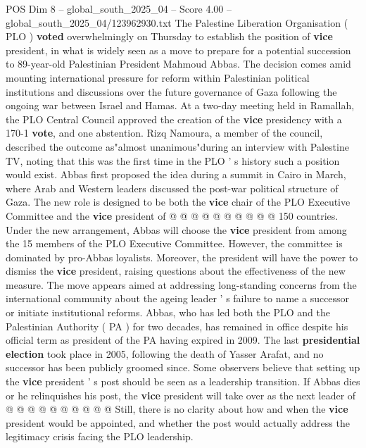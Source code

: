 \begin{textsample}{POS Dim 8 – global\_south\_2025\_04 – Score 4.00 – global\_south\_2025\_04/123962930.txt}  \label{ex:f8_pos_413}
The Palestine Liberation Organisation ( PLO ) \textbf{voted} overwhelmingly on Thursday to establish the position of \textbf{vice} president, in what is widely seen as a move to prepare for a potential succession to 89-year-old Palestinian President Mahmoud Abbas.
The decision comes amid mounting international pressure for reform within Palestinian political institutions and discussions over the future governance of Gaza following the ongoing war between Israel and Hamas.
At a two-day meeting held in Ramallah, the PLO Central Council approved the creation of the \textbf{vice} presidency with a 170-1 \textbf{vote}, and one abstention.
Rizq Namoura, a member of the council, described the outcome as"almost unanimous"during an interview with Palestine TV, noting that this was the first time in the PLO ' s history such a position would exist.
Abbas first proposed the idea during a summit in Cairo in March, where Arab and Western leaders discussed the post-war political structure of Gaza.
The new role is designed to be both the \textbf{vice} chair of the PLO Executive Committee and the \textbf{vice} president of @ @ @ @ @ @ @ @ @ @ 150 countries.
Under the new arrangement, Abbas will choose the \textbf{vice} president from among the 15 members of the PLO Executive Committee.
However, the committee is dominated by pro-Abbas loyalists.
Moreover, the president will have the power to dismiss the \textbf{vice} president, raising questions about the effectiveness of the new measure.
The move appears aimed at addressing long-standing concerns from the international community about the ageing leader ' s failure to name a successor or initiate institutional reforms.
Abbas, who has led both the PLO and the Palestinian Authority ( PA ) for two decades, has remained in office despite his official term as president of the PA having expired in 2009.
The last \textbf{presidential} \textbf{election} took place in 2005, following the death of Yasser Arafat, and no successor has been publicly groomed since.
Some observers believe that setting up the \textbf{vice} president ' s post should be seen as a leadership transition.
If Abbas dies or he relinquishes his post, the \textbf{vice} president will take over as the next leader of @ @ @ @ @ @ @ @ @ @ Still, there is no clarity about how and when the \textbf{vice} president would be appointed, and whether the post would actually address the legitimacy crisis facing the PLO leadership.

\end{textsample}
